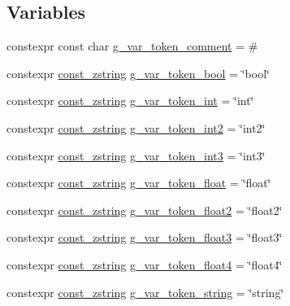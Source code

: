 \subsection*{Variables}
\begin{DoxyCompactItemize}
\item 
constexpr const char \mbox{\hyperlink{namespacemage_1_1loader_a51fd34b486dfe1d203f7c7b897b2fd2c}{g\+\_\+var\+\_\+token\+\_\+comment}} = \textquotesingle{}\#\textquotesingle{}
\item 
constexpr \mbox{\hyperlink{namespacemage_abfd9206dc607ceb5d13ec68bf075a5c0}{const\+\_\+zstring}} \mbox{\hyperlink{namespacemage_1_1loader_a0457a884e6f6cd7228676907e829575b}{g\+\_\+var\+\_\+token\+\_\+bool}} = \char`\"{}bool\char`\"{}
\item 
constexpr \mbox{\hyperlink{namespacemage_abfd9206dc607ceb5d13ec68bf075a5c0}{const\+\_\+zstring}} \mbox{\hyperlink{namespacemage_1_1loader_aa147b458d6b9bbe4b481df6468027055}{g\+\_\+var\+\_\+token\+\_\+int}} = \char`\"{}int\char`\"{}
\item 
constexpr \mbox{\hyperlink{namespacemage_abfd9206dc607ceb5d13ec68bf075a5c0}{const\+\_\+zstring}} \mbox{\hyperlink{namespacemage_1_1loader_a56b5eb839752f752fe25139e893d02d5}{g\+\_\+var\+\_\+token\+\_\+int2}} = \char`\"{}int2\char`\"{}
\item 
constexpr \mbox{\hyperlink{namespacemage_abfd9206dc607ceb5d13ec68bf075a5c0}{const\+\_\+zstring}} \mbox{\hyperlink{namespacemage_1_1loader_a6d17673197d2bb9487c8c874a741da8f}{g\+\_\+var\+\_\+token\+\_\+int3}} = \char`\"{}int3\char`\"{}
\item 
constexpr \mbox{\hyperlink{namespacemage_abfd9206dc607ceb5d13ec68bf075a5c0}{const\+\_\+zstring}} \mbox{\hyperlink{namespacemage_1_1loader_aa53b6d14e0550f8bc69f9383658abe4a}{g\+\_\+var\+\_\+token\+\_\+float}} = \char`\"{}float\char`\"{}
\item 
constexpr \mbox{\hyperlink{namespacemage_abfd9206dc607ceb5d13ec68bf075a5c0}{const\+\_\+zstring}} \mbox{\hyperlink{namespacemage_1_1loader_aa28f34682195162b5274c767b2221b41}{g\+\_\+var\+\_\+token\+\_\+float2}} = \char`\"{}float2\char`\"{}
\item 
constexpr \mbox{\hyperlink{namespacemage_abfd9206dc607ceb5d13ec68bf075a5c0}{const\+\_\+zstring}} \mbox{\hyperlink{namespacemage_1_1loader_a791abcdb5a1a298a02b2a1ea0d7d44c9}{g\+\_\+var\+\_\+token\+\_\+float3}} = \char`\"{}float3\char`\"{}
\item 
constexpr \mbox{\hyperlink{namespacemage_abfd9206dc607ceb5d13ec68bf075a5c0}{const\+\_\+zstring}} \mbox{\hyperlink{namespacemage_1_1loader_a090338735c82aa00b47b04740d53bdcd}{g\+\_\+var\+\_\+token\+\_\+float4}} = \char`\"{}float4\char`\"{}
\item 
constexpr \mbox{\hyperlink{namespacemage_abfd9206dc607ceb5d13ec68bf075a5c0}{const\+\_\+zstring}} \mbox{\hyperlink{namespacemage_1_1loader_a653c16a1fffe8a8f00cc11923d6243a8}{g\+\_\+var\+\_\+token\+\_\+string}} = \char`\"{}string\char`\"{}
\end{DoxyCompactItemize}


